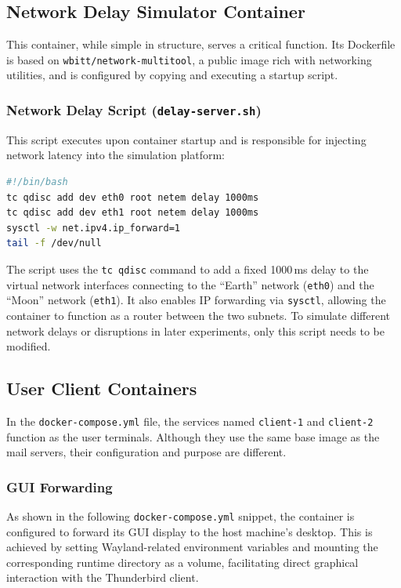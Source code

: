 \subsection{Network Delay Simulator Container}
This container, while simple in structure, serves a critical function. Its Dockerfile is based on \texttt{wbitt/network-multitool}, a public image rich with networking utilities, and is configured by copying and executing a startup script.

\subsubsection*{Network Delay Script (\texttt{delay-server.sh})}

This script executes upon container startup and is responsible for injecting network latency into the simulation platform:

\begin{lstlisting}[language=bash,caption={delay-server.sh startup script}]
#!/bin/bash
tc qdisc add dev eth0 root netem delay 1000ms
tc qdisc add dev eth1 root netem delay 1000ms
sysctl -w net.ipv4.ip_forward=1
tail -f /dev/null
\end{lstlisting}

The script uses the \texttt{tc qdisc} command to add a fixed 1000\,ms delay to the virtual network interfaces connecting to the ``Earth'' network (\texttt{eth0}) and the ``Moon'' network (\texttt{eth1}). It also enables IP forwarding via \texttt{sysctl}, allowing the container to function as a router between the two subnets.  
To simulate different network delays or disruptions in later experiments, only this script needs to be modified.

\subsection{User Client Containers}

In the \texttt{docker-compose.yml} file, the services named \texttt{client-1} and \texttt{client-2} function as the user terminals. Although they use the same base image as the mail servers, their configuration and purpose are different.

\subsubsection*{GUI Forwarding}

As shown in the following \texttt{docker-compose.yml} snippet, the container is configured to forward its GUI display to the host machine's desktop. This is achieved by setting Wayland-related environment variables and mounting the corresponding runtime directory as a volume, facilitating direct graphical interaction with the Thunderbird client.

